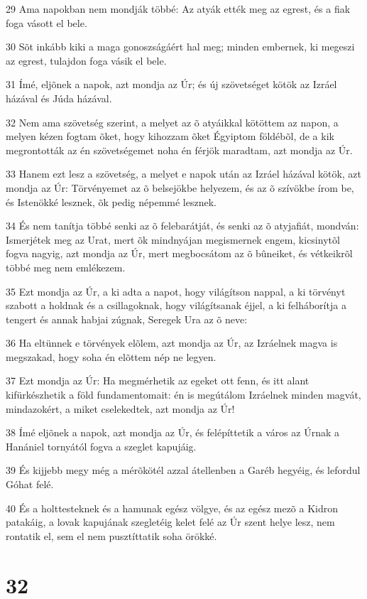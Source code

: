 \par 29 Ama napokban nem mondják többé: Az atyák ették meg az egrest, és a fiak foga vásott el bele.
\par 30 Sõt inkább kiki a maga gonoszságáért hal meg; minden embernek, ki megeszi az egrest, tulajdon foga vásik el bele.
\par 31 Ímé, eljõnek a napok, azt mondja az Úr; és új szövetséget kötök az Izráel házával és Júda házával.
\par 32 Nem ama szövetség szerint, a melyet az õ atyáikkal kötöttem az napon, a melyen kézen fogtam õket, hogy kihozzam õket Égyiptom földébõl, de a kik megrontották  az én szövetségemet noha én férjök maradtam, azt mondja az Úr.
\par 33 Hanem ezt lesz a szövetség, a melyet e napok után az Izráel házával kötök, azt mondja az Úr: Törvényemet az õ belsejökbe helyezem, és az õ szívökbe írom be, és Istenökké lesznek, õk pedig népemmé lesznek.
\par 34 És nem tanítja többé senki az õ felebarátját, és senki az õ atyjafiát, mondván: Ismerjétek meg az Urat, mert õk mindnyájan megismernek engem, kicsinytõl fogva nagyig, azt mondja az Úr, mert megbocsátom  az õ bûneiket, és vétkeikrõl többé meg nem emlékezem.
\par 35 Ezt mondja az Úr, a ki adta a napot, hogy világítson nappal, a ki törvényt szabott a holdnak és a csillagoknak, hogy világítsanak éjjel, a ki felháborítja a tengert és annak habjai zúgnak, Seregek Ura az õ neve:
\par 36 Ha eltünnek e törvények elõlem, azt mondja az Úr, az Izráelnek magva is megszakad, hogy soha én elõttem nép ne legyen.
\par 37 Ezt mondja az Úr: Ha megmérhetik az egeket ott fenn, és itt alant kifürkészhetik a föld fundamentomait: én is megútálom Izráelnek minden magvát, mindazokért, a miket cselekedtek, azt mondja az Úr!
\par 38 Ímé eljõnek a napok, azt mondja az Úr, és felépíttetik a város az Úrnak a Hanániel tornyától fogva a szeglet kapujáig.
\par 39 És kijjebb megy még a mérõkötél azzal átellenben a Garéb hegyéig, és lefordul Góhat felé.
\par 40 És a holttesteknek és a hamunak egész völgye, és az egész mezõ a Kidron patakáig, a lovak kapujának szegletéig kelet felé az Úr szent helye lesz, nem rontatik el, sem el nem pusztíttatik soha örökké.

\chapter{32}

